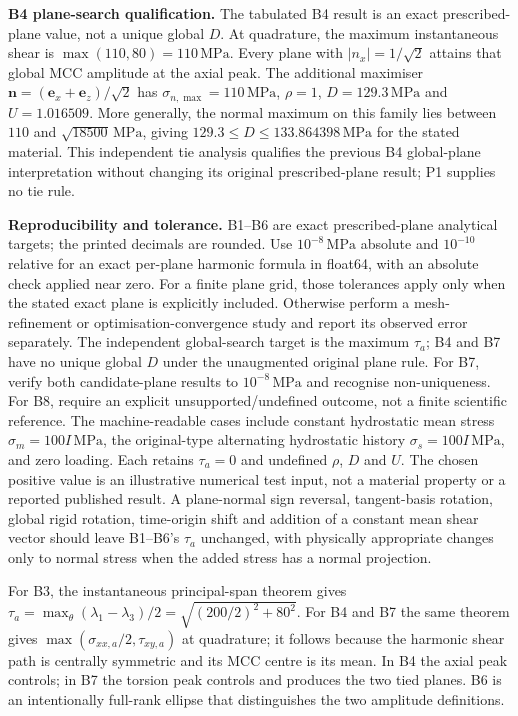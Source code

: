 \documentclass[10pt,a4paper]{article}
\newcommand{\lab}[1]{\textbf{#1.}}
\newcommand{\MPa}{\,\mathrm{MPa}}
\newcommand{\ta}{\tau_{a}}
\begin{document}
\lab{B4 plane-search qualification} The tabulated B4 result is an exact prescribed-plane value, not a unique global $D$. At quadrature, the maximum instantaneous shear is $\max(110,80)=110\MPa$. Every plane with $|n_x|=1/\sqrt2$ attains that global MCC amplitude at the axial peak. The additional maximiser $\mathbf n=(\mathbf e_x+\mathbf e_z)/\sqrt2$ has $\sigma_{n,\max}=110\MPa$, $\rho=1$, $D=129.3\MPa$ and $U=1.016509$. More generally, the normal maximum on this family lies between $110$ and $\sqrt{18500}\MPa$, giving $129.3\leq D\leq133.864398\MPa$ for the stated material. This independent tie analysis qualifies the previous B4 global-plane interpretation without changing its original prescribed-plane result; P1 supplies no tie rule.

\lab{Reproducibility and tolerance} B1--B6 are exact prescribed-plane analytical targets; the printed decimals are rounded. Use $10^{-8}\MPa$ absolute and $10^{-10}$ relative for an exact per-plane harmonic formula in float64, with an absolute check applied near zero. For a finite plane grid, those tolerances apply only when the stated exact plane is explicitly included. Otherwise perform a mesh-refinement or optimisation-convergence study and report its observed error separately. The independent global-search target is the maximum $\ta$; B4 and B7 have no unique global $D$ under the unaugmented original plane rule. For B7, verify both candidate-plane results to $10^{-8}\MPa$ and recognise non-uniqueness. For B8, require an explicit unsupported/undefined outcome, not a finite scientific reference. The machine-readable cases include constant hydrostatic mean stress $\sigma_m=100I\MPa$, the original-type alternating hydrostatic history $\sigma_s=100I\MPa$, and zero loading. Each retains $\ta=0$ and undefined $\rho$, $D$ and $U$. The chosen positive value is an illustrative numerical test input, not a material property or a reported published result. A plane-normal sign reversal, tangent-basis rotation, global rigid rotation, time-origin shift and addition of a constant mean shear vector should leave B1--B6's $\ta$ unchanged, with physically appropriate changes only to normal stress when the added stress has a normal projection.

For B3, the instantaneous principal-span theorem gives $\ta=\max_\theta(\lambda_1-\lambda_3)/2=\sqrt{(200/2)^2+80^2}$. For B4 and B7 the same theorem gives $\max(\sigma_{xx,a}/2,\tau_{xy,a})$ at quadrature; it follows because the harmonic shear path is centrally symmetric and its MCC centre is its mean. In B4 the axial peak controls; in B7 the torsion peak controls and produces the two tied planes. B6 is an intentionally full-rank ellipse that distinguishes the two amplitude definitions.
\end{document}
